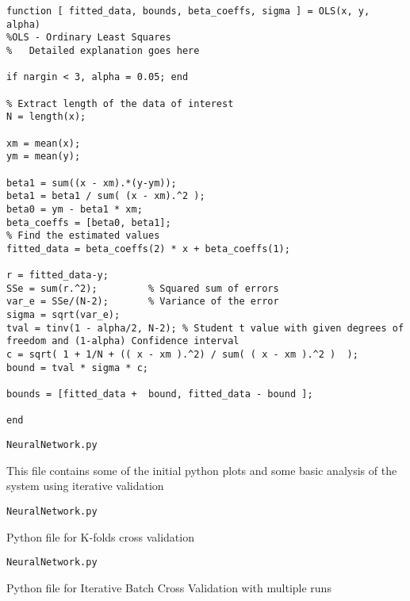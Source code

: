 \documentclass{article}
\begin{document}
\begin{lstlisting}
function [ fitted_data, bounds, beta_coeffs, sigma ] = OLS(x, y, alpha)
%OLS - Ordinary Least Squares
%   Detailed explanation goes here

if nargin < 3, alpha = 0.05; end

% Extract length of the data of interest
N = length(x);

xm = mean(x);
ym = mean(y);

beta1 = sum((x - xm).*(y-ym));
beta1 = beta1 / sum( (x - xm).^2 );
beta0 = ym - beta1 * xm;
beta_coeffs = [beta0, beta1];
% Find the estimated values
fitted_data = beta_coeffs(2) * x + beta_coeffs(1);

r = fitted_data-y;
SSe = sum(r.^2);         % Squared sum of errors
var_e = SSe/(N-2);       % Variance of the error
sigma = sqrt(var_e);
tval = tinv(1 - alpha/2, N-2); % Student t value with given degrees of freedom and (1-alpha) Confidence interval
c = sqrt( 1 + 1/N + (( x - xm ).^2) / sum( ( x - xm ).^2 )  );
bound = tval * sigma * c;

bounds = [fitted_data +  bound, fitted_data - bound ];

end
\end{lstlisting}


\texttt{NeuralNetwork.py}

This file contains some of the initial python plots and some basic analysis of the system using iterative validation



\texttt{NeuralNetwork.py}

Python file for K-folds cross validation




\texttt{NeuralNetwork.py}

Python file for Iterative Batch Cross Validation with multiple runs






\end{document}
